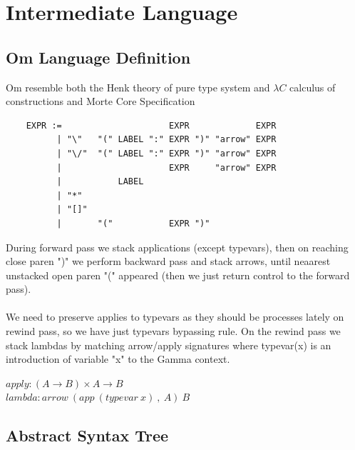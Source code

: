 \documentclass[11pt,oneside]{article}
\begin{document}
\newpage

  \section{Intermediate Language}
\vspace{1cm}

   \subsection{Om Language Definition}
\vspace{0.5cm}
   Om resemble both the Henk theory of pure type system and $\lambda C$ calculus of constructions
   and Morte Core Specification

\begin{lstlisting}
    EXPR :=                     EXPR             EXPR 
          | "\"   "(" LABEL ":" EXPR ")" "arrow" EXPR 
          | "\/"  "(" LABEL ":" EXPR ")" "arrow" EXPR 
          |                     EXPR     "arrow" EXPR 
          |           LABEL                           
          | "*"                                       
          | "[]"                                      
          |       "("           EXPR ")"              
\end{lstlisting}

During forward pass we stack applications (except typevars), then
on reaching close paren ")" we perform backward pass and stack arrows,
until neaarest unstacked open paren "(" appeared (then we just return
control to the forward pass).

\paragraph{}
We need to preserve applies to typevars as they should
be processes lately on rewind pass, so we have just typevars bypassing rule.
On the rewind pass we stack lambdas by matching arrow/apply signatures
where typevar(x) is an introduction of variable "x" to the Gamma context.

\begin{center}
                   $apply: (A \rightarrow B) \times A \rightarrow B$ \\
                  $lambda: arrow\ (app\ (typevar\ x)\ ,\ A)\ B$ \\
\end{center}


   \subsection{Abstract Syntax Tree}
\end{document}
